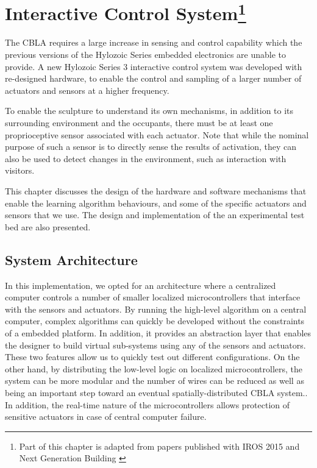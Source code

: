 \chapter[Interactive Control System]
{Interactive Control System\footnote{Part of this chapter is adapted from papers published with IROS 2015 \cite{Chan2015} and Next Generation Building \cite{Gorbet2015}}} 
\label{chap:ctrl_system}

The CBLA requires a large increase in sensing and control capability which the previous versions of the Hylozoic Series embedded electronics \cite{Beesley2010} are unable to provide. A new Hylozoic Series 3 interactive control system was developed with re-designed hardware, to enable the control and sampling of a larger number of actuators and sensors at a higher frequency. 

To enable the sculpture to understand its own mechanisms, in addition to its surrounding environment and the occupants, there must be at least one proprioceptive sensor associated with each actuator. Note that while the nominal purpose of such a sensor is to directly sense the results of activation, they can also be used to detect changes in the environment, such as interaction with visitors.

This chapter discusses the design of the hardware and software mechanisms that enable the learning algorithm behaviours, and some of the specific actuators and sensors that we use. The design and implementation of the an experimental test bed are also presented. 


\section{System Architecture}

In this implementation, we opted for an architecture where a centralized computer controls a number of smaller localized microcontrollers that interface with the sensors and actuators. By running the high-level algorithm on a central computer, complex algorithms can quickly be developed without the constraints of a embedded platform. In addition, it provides an abstraction layer that enables the designer to build virtual sub-systems using any of the sensors and actuators. These two features allow us to quickly test out different configurations. On the other hand, by distributing the low-level logic on localized microcontrollers, the system can be more modular and the number of wires can be reduced as well as being an important step toward an eventual spatially-distributed CBLA system.. In addition, the real-time nature of the microcontrollers allows protection of sensitive actuators in case of central computer failure. 

